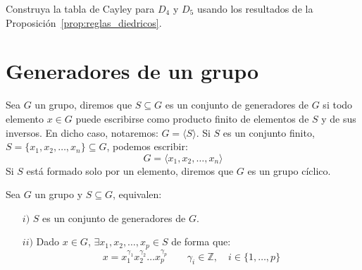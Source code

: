 \begin{ejercicio*}
    Construya la tabla de Cayley para $D_4$ y $D_5$ usando los resultados de la Proposición~\ref{prop:reglas_diedricos}.
\end{ejercicio*}

\section{Generadores de un grupo}
\begin{definicion}
    Sea $G$ un grupo, diremos que $S\subseteq G$ es un conjunto de generadores de $G$ si todo elemento $x\in G$ puede escribirse como producto finito de elementos de $S$ y de sus inversos. En dicho caso, notaremos: $G = \langle S \rangle $.\newline
    Si $S$ es un conjunto finito, $S= \{x_1,x_2,\ldots,x_n\}\subseteq G$, podemos escribir:
    \begin{equation*}
        G = \langle x_1,x_2,\ldots,x_n \rangle 
    \end{equation*}
    Si $S$ está formado solo por un elemento, diremos que $G$ es un grupo cíclico.
\end{definicion}

\begin{observacion}
    Sea $G$ un grupo y $S\subseteq G$, equivalen:
    \begin{enumerate}
        \item[$i)$] $S$ es un conjunto de generadores de $G$.
        \item[$ii)$] Dado $x\in G$, $\exists x_1,x_2,\ldots,x_p \in S$ de forma que:
            \begin{equation*}
                x = x_1^{\gamma_1}x_2^{\gamma_2} \ldots x_p^{\gamma_p} \qquad \gamma_i \in  \mathbb{Z}, \quad i \in \{1,\ldots,p\}
            \end{equation*}
    \end{enumerate}
\end{observacion}

